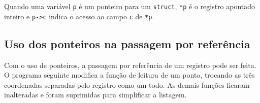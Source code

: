 \documentclass[
  11pt,
  a4paper,
]{scrbook}
\begin{document}
Quando uma variável \texttt{p} é um ponteiro para um \texttt{struct},
\texttt{*p} é o registro apontado inteiro e \texttt{p-\textgreater{}c}
indica o acesso ao campo \texttt{c} de \texttt{*p}.

\subsection{Uso dos ponteiros na passagem por
referência}\label{uso-dos-ponteiros-na-passagem-por-referuxeancia}

Com o uso de ponteiros, a passagem por referência de um registro pode
ser feita. O programa seguinte modifica a função de leitura de um ponto,
trocando as três coordenadas separadas pelo registro como um todo. As
demais funções ficaram inalteradas e foram suprimidas para simplificar a
listagem.
\end{document}
